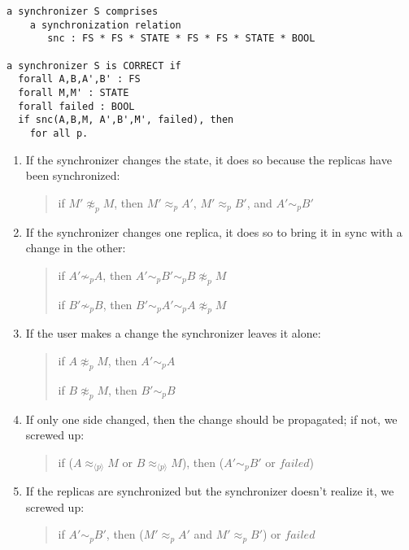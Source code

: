 \documentclass[12pt]{article}
\newcommand{\failed}{\ensuremath{\mathit{failed}}}
\newcommand{\agreeAt}[1]{\sim_{#1}}
\newcommand{\AgreeAt}[1]{\approx_{#1}}
\newcommand{\AgreeAround}[1]{\approx_{\langle #1\rangle}}
\begin{document}
\begin{verbatim}
a synchronizer S comprises
    a synchronization relation
       snc : FS * FS * STATE * FS * FS * STATE * BOOL

a synchronizer S is CORRECT if
  forall A,B,A',B' : FS
  forall M,M' : STATE
  forall failed : BOOL
  if snc(A,B,M, A',B',M', failed), then
    for all p.
\end{verbatim}

\begin{enumerate}
\item If the synchronizer changes the state, it does so because the
  replicas have been synchronized:
  \begin{quote}
    if $M'\not\AgreeAt{p} M$,
    then $M'\AgreeAt{p} A'$, $M'\AgreeAt{p} B'$, and $A'\agreeAt{p} B'$
  \end{quote}
  
\item If the synchronizer changes one replica, it does so to bring it
  in sync with a change in the other:
  \begin{quote}
    if $A'\not\agreeAt{p} A$,
    then $A'\agreeAt{p} B'\agreeAt{p} B\not\AgreeAt{p} M$

    if $B'\not\agreeAt{p} B$,
    then $B'\agreeAt{p} A'\agreeAt{p} A\not\AgreeAt{p} M$
  \end{quote}
      
\item If the user makes a change the synchronizer leaves it alone:
  \begin{quote}
    if $A\not\AgreeAt{p} M$,
    then $A'\agreeAt{p} A$

    if $B\not\AgreeAt{p} M$,
    then $B'\agreeAt{p} B$
  \end{quote}
  
\item If only one side changed, then the change should be propagated;
  if not, we screwed up:
  \begin{quote}
    if ($A\AgreeAround{p} M$ or $B\AgreeAround{p} M$),
    then ($A'\agreeAt{p} B'$ or $\failed$)
  \end{quote}
  
\item If the replicas are synchronized but the synchronizer doesn't
  realize it, we screwed up:
  \begin{quote}
    if $A'\agreeAt{p} B'$,
    then
    ($M'\AgreeAt{p} A'$ and $M'\AgreeAt{p} B'$) or $\failed$
  \end{quote}

\end{enumerate}
\end{document}
